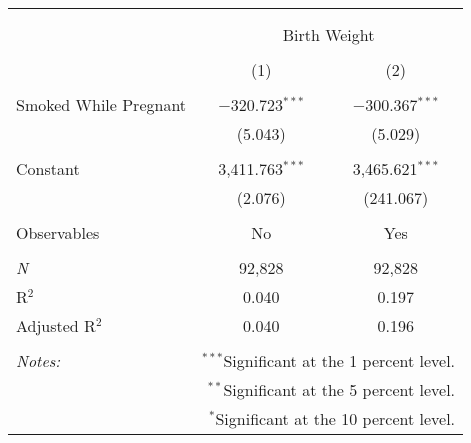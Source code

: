 
\begin{table}[!htbp] \centering 
  \caption{} 
  \label{} 
\begin{tabular}{@{\extracolsep{5pt}}lcc} 
\\[-1.8ex]\hline 
\hline \\[-1.8ex] 
\\[-1.8ex] & \multicolumn{2}{c}{Birth Weight} \\ 
\\[-1.8ex] & (1) & (2)\\ 
\hline \\[-1.8ex] 
 Smoked While Pregnant & $-$320.723$^{***}$ & $-$300.367$^{***}$ \\ 
  & (5.043) & (5.029) \\ 
  & & \\ 
 Constant & 3,411.763$^{***}$ & 3,465.621$^{***}$ \\ 
  & (2.076) & (241.067) \\ 
  & & \\ 
Observables & No & Yes \\ 
 &  &  \\ 
\textit{N} & 92,828 & 92,828 \\ 
R$^{2}$ & 0.040 & 0.197 \\ 
Adjusted R$^{2}$ & 0.040 & 0.196 \\ 
\hline 
\hline \\[-1.8ex] 
\textit{Notes:} & \multicolumn{2}{r}{$^{***}$Significant at the 1 percent level.} \\ 
 & \multicolumn{2}{r}{$^{**}$Significant at the 5 percent level.} \\ 
 & \multicolumn{2}{r}{$^{*}$Significant at the 10 percent level.} \\ 
\end{tabular} 
\end{table} 
